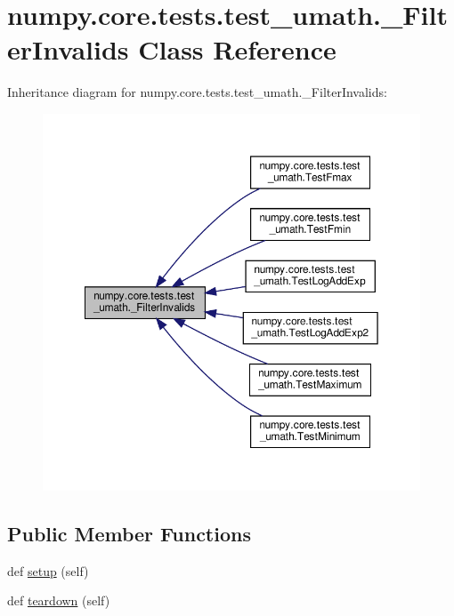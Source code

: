\hypertarget{classnumpy_1_1core_1_1tests_1_1test__umath_1_1__FilterInvalids}{}\section{numpy.\+core.\+tests.\+test\+\_\+umath.\+\_\+\+Filter\+Invalids Class Reference}
\label{classnumpy_1_1core_1_1tests_1_1test__umath_1_1__FilterInvalids}


Inheritance diagram for numpy.\+core.\+tests.\+test\+\_\+umath.\+\_\+\+Filter\+Invalids\+:
\nopagebreak
\begin{figure}[H]
\begin{center}
\leavevmode
\includegraphics[width=350pt]{classnumpy_1_1core_1_1tests_1_1test__umath_1_1__FilterInvalids__inherit__graph}
\end{center}
\end{figure}
\subsection*{Public Member Functions}
\begin{DoxyCompactItemize}
\item 
def \hyperlink{classnumpy_1_1core_1_1tests_1_1test__umath_1_1__FilterInvalids_ab95f5293813b71b6d97fde945788cf5f}{setup} (self)
\item 
def \hyperlink{classnumpy_1_1core_1_1tests_1_1test__umath_1_1__FilterInvalids_a3135d76405d5cc3f43b7b672e2aafed0}{teardown} (self)
\end{DoxyCompactItemize}
